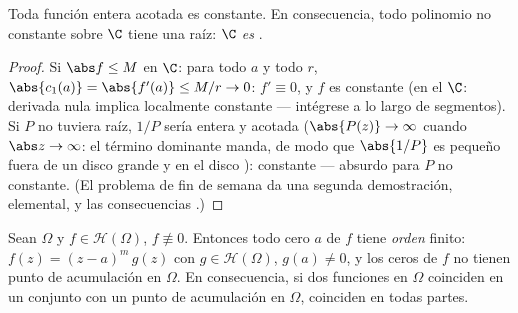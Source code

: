 \begin{corollary}
\label{cor:b3:holomorphic:liouville}
Toda función entera acotada es constante. En consecuencia, todo
polinomio no constante sobre $\C$ tiene una raíz: \emph{$\C$ es
}.
\end{corollary}

\begin{proof}
Si $\abs f \leq M$ en $\C$: para todo $a$ y todo $r$, $\abs{c_1(a)}
= \abs{f'(a)} \leq M/r \to 0$: $f' \equiv 0$, y $f$ es constante (en el
 $\C$: derivada nula implica
localmente constante --- intégrese a lo largo de segmentos). Si $P$ no
tuviera raíz, $1/P$ sería entera y acotada ($\abs{P(z)} \to
\infty$ cuando $\abs z \to \infty$: el término dominante manda, de modo
que $\abs{1/P}$ es pequeño fuera de un disco grande y
 en el disco
): constante --- absurdo para
$P$ no constante. (El problema de fin de semana da una segunda
demostración, elemental, y las consecuencias
.)
\end{proof}

\begin{theorem}
\label{thm:b3:holomorphic:identity}
Sean $\Omega$ \emph{} y
$f \in \mathcal
H(\Omega)$, $f \not\equiv 0$. Entonces todo cero $a$ de $f$ tiene
\emph{orden} finito: $f(z) = (z - a)^m\,g(z)$ con $g \in
\mathcal H(\Omega)$, $g(a) \neq 0$, y los ceros de $f$ no tienen punto
de acumulación en $\Omega$. En consecuencia, si dos
funciones  en $\Omega$
coinciden en un conjunto con un punto de acumulación en $\Omega$,
coinciden en todas partes.
\end{theorem}

